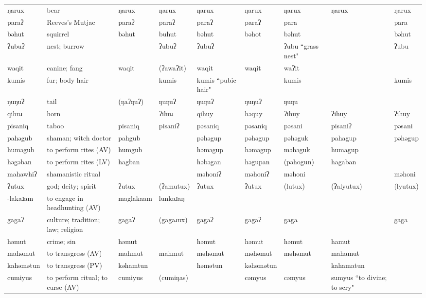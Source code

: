 \begin{landscape}
\begin{longtable}{*{9}{>{\raggedright\arraybackslash}p{}}}
\text{*}ŋarux & bear & ŋarux & ŋarux & ŋarux & ŋarux & ŋarux & ŋarux & ŋarux\\
\text{*}paraʔ & Reeves's Mutjac & paraʔ & paraʔ & paraʔ & paraʔ & para &  & para\\
\text{*}bəhut & squirrel & bəhut & buhut & bəhut & bəhot & bəhut &  & bəhut\\
\text{*}ʔubuʔ & nest; burrow &  & ʔubuʔ & ʔubuʔ &  & ʔubu ``grass nest" &  & ʔubu\\
\text{*}waqit & canine; fang & waqit & (ʔawaʔit) & waqit & waqit & waʔit &  & \\
\text{*}kumis & fur; body hair &  & kumis & kumis ``pubic hair" &  & kumis &  & kumis\\
\text{*}ŋuŋuʔ & tail & (ŋaʔŋuʔ) & ŋuŋuʔ & ŋuŋuʔ & ŋuŋuʔ & ŋuŋu &  & \\
\text{*}qihuɹ & horn &  & ʔihuɹ & qihuy & həquy & ʔihuy & ʔihuy & ʔihuy\\
\text{*}pisaniq & taboo & pisaniq & pisaniʔ & pəsaniq & pəsaniq & pəsani & pisaniʔ & pəsani\\
\text{*}pahəgub & shaman; witch doctor & pahgub &  & pəhəgup & pəhəgup & pəhəguk & pahagup & pəhəgup\\
\text{*}huməgub & to perform rites (AV) & humgub &  & həməgup & həməgup & məhəguk & humagup & \\
\text{*}həgəban & to perform rites (LV) & hagban &  & həbəgan & həgupan & (pəhogun) & hagaban & \\
\text{*}mahawhiʔ & shamanistic ritual &  &  & məhoniʔ & məhoniʔ & məhoni &  & məhoni\\
\text{*}ʔutux & god; deity; spirit & ʔutux & (ʔamutux) & ʔutux & ʔutux & (lutux) & (ʔalyutux) & (lyutux)\\
\text{*}-lakaɹam & to engage in headhunting (AV) & maglakaam & lunkaɹaŋ &  &  &  &  & \\
\text{*}gagaʔ & culture; tradition; law; religion & gagaʔ & (gagaɹux) & gagaʔ & gagaʔ & gaga &  & gaga\\
\text{*}həmut & crime; sin & həmut &  & həmut & həmut & həmut & hamut & \\
\text{*}mahəmut & to transgress (AV) & mahmut & mahmut & məhəmut & məhəmut & məhəmut & mahamut & \\
\text{*}kahəmətun & to transgress (PV) & kəhamtun &  & həmətun & kəhəmətun &  & kahamatun & \\
\text{*}cumiyus & to perform ritual; to curse (AV) & cumiyus & (cumiŋas) &  & cəmyus & cəmyus & sumyus ``to divine; to scry" & \\

\end{longtable}
\end{landscape}
